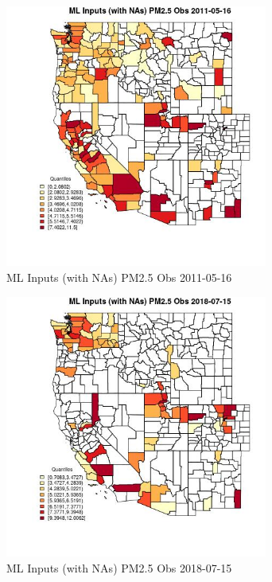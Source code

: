 \begin{figure} 
\centering  
\includegraphics[width=0.77\textwidth]{Code_Outputs/Report_ML_input_PM25_Step4_part_e_de_duplicated_aveswNAs_CountyPM25_ObsMean2011-05-16_2011-05-16.jpg} 
\caption{\label{fig:Report_ML_input_PM25_Step4_part_e_de_duplicated_aveswNAsCountyPM25_ObsMean2011-05-16_2011-05-16}ML Inputs (with NAs) PM2.5 Obs 2011-05-16} 
\end{figure} 
 

\begin{figure} 
\centering  
\includegraphics[width=0.77\textwidth]{Code_Outputs/Report_ML_input_PM25_Step4_part_e_de_duplicated_aveswNAs_CountyPM25_ObsMean2018-07-15_2018-07-15.jpg} 
\caption{\label{fig:Report_ML_input_PM25_Step4_part_e_de_duplicated_aveswNAsCountyPM25_ObsMean2018-07-15_2018-07-15}ML Inputs (with NAs) PM2.5 Obs 2018-07-15} 
\end{figure} 
 

